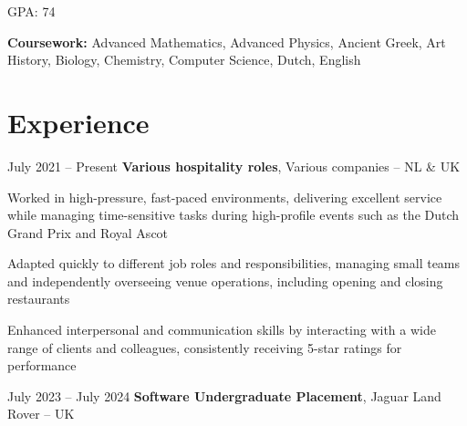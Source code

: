 	\vspace{0.10 cm}
	\begin{onecolentry}
		\begin{highlights}
			\item GPA: 74
			\item \textbf{Coursework:} Advanced Mathematics, Advanced Physics, Ancient Greek, Art History, Biology, Chemistry, Computer Science, Dutch, English
		\end{highlights}
	\end{onecolentry}
	
	\section{Experience}
	
	\begin{twocolentry}{
			July 2021 – Present
		}
		\textbf{Various hospitality roles}, Various companies -- NL \& UK
	\end{twocolentry}
	
	\vspace{0.10 cm}
	\begin{onecolentry}
		\begin{highlights}
			\item Worked in high-pressure, fast-paced environments, delivering excellent service while managing time-sensitive tasks during high-profile events such as the Dutch Grand Prix and Royal Ascot
			\item Adapted quickly to different job roles and responsibilities, managing small teams and independently overseeing venue operations, including opening and closing restaurants
			\item Enhanced interpersonal and communication skills by interacting with a wide range of clients and colleagues, consistently receiving 5-star ratings for performance
		\end{highlights}
	\end{onecolentry}
	
	\vspace{0.2 cm}
	
	\begin{twocolentry}{
			July 2023 – July 2024
		}
		\textbf{Software Undergraduate Placement}, Jaguar Land Rover -- UK
	\end{twocolentry}
	
